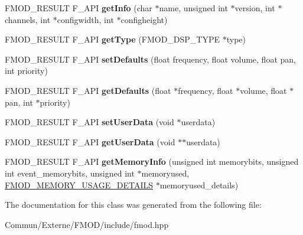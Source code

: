 \begin{DoxyCompactItemize}
\item 
F\+M\+O\+D\+\_\+\+R\+E\+S\+U\+LT F\+\_\+\+A\+PI {\bfseries get\+Info} (char $\ast$name, unsigned int $\ast$version, int $\ast$channels, int $\ast$configwidth, int $\ast$configheight)\hypertarget{class_f_m_o_d_1_1_d_s_p_a5bb61015d7b0e835437e46ea4eaf6442}{}\label{class_f_m_o_d_1_1_d_s_p_a5bb61015d7b0e835437e46ea4eaf6442}

\item 
F\+M\+O\+D\+\_\+\+R\+E\+S\+U\+LT F\+\_\+\+A\+PI {\bfseries get\+Type} (F\+M\+O\+D\+\_\+\+D\+S\+P\+\_\+\+T\+Y\+PE $\ast$type)\hypertarget{class_f_m_o_d_1_1_d_s_p_a7241c2669554667f90d4f2a576f64c4a}{}\label{class_f_m_o_d_1_1_d_s_p_a7241c2669554667f90d4f2a576f64c4a}

\item 
F\+M\+O\+D\+\_\+\+R\+E\+S\+U\+LT F\+\_\+\+A\+PI {\bfseries set\+Defaults} (float frequency, float volume, float pan, int priority)\hypertarget{class_f_m_o_d_1_1_d_s_p_a97919dbf4f783369b75f1bc43527489d}{}\label{class_f_m_o_d_1_1_d_s_p_a97919dbf4f783369b75f1bc43527489d}

\item 
F\+M\+O\+D\+\_\+\+R\+E\+S\+U\+LT F\+\_\+\+A\+PI {\bfseries get\+Defaults} (float $\ast$frequency, float $\ast$volume, float $\ast$pan, int $\ast$priority)\hypertarget{class_f_m_o_d_1_1_d_s_p_a80aa58e2f153dd3ad5fb6bf9305fc00e}{}\label{class_f_m_o_d_1_1_d_s_p_a80aa58e2f153dd3ad5fb6bf9305fc00e}

\item 
F\+M\+O\+D\+\_\+\+R\+E\+S\+U\+LT F\+\_\+\+A\+PI {\bfseries set\+User\+Data} (void $\ast$userdata)\hypertarget{class_f_m_o_d_1_1_d_s_p_a5aacd4725dbe50b725146bd6c412b0f4}{}\label{class_f_m_o_d_1_1_d_s_p_a5aacd4725dbe50b725146bd6c412b0f4}

\item 
F\+M\+O\+D\+\_\+\+R\+E\+S\+U\+LT F\+\_\+\+A\+PI {\bfseries get\+User\+Data} (void $\ast$$\ast$userdata)\hypertarget{class_f_m_o_d_1_1_d_s_p_a1b9014166d1ad45923da3227d8db3439}{}\label{class_f_m_o_d_1_1_d_s_p_a1b9014166d1ad45923da3227d8db3439}

\item 
F\+M\+O\+D\+\_\+\+R\+E\+S\+U\+LT F\+\_\+\+A\+PI {\bfseries get\+Memory\+Info} (unsigned int memorybits, unsigned int event\+\_\+memorybits, unsigned int $\ast$memoryused, \hyperlink{struct_f_m_o_d___m_e_m_o_r_y___u_s_a_g_e___d_e_t_a_i_l_s}{F\+M\+O\+D\+\_\+\+M\+E\+M\+O\+R\+Y\+\_\+\+U\+S\+A\+G\+E\+\_\+\+D\+E\+T\+A\+I\+LS} $\ast$memoryused\+\_\+details)\hypertarget{class_f_m_o_d_1_1_d_s_p_acac5f7f04e8e67719a712f848793e8f8}{}\label{class_f_m_o_d_1_1_d_s_p_acac5f7f04e8e67719a712f848793e8f8}

\end{DoxyCompactItemize}


The documentation for this class was generated from the following file\+:\begin{DoxyCompactItemize}
\item 
Commun/\+Externe/\+F\+M\+O\+D/include/fmod.\+hpp\end{DoxyCompactItemize}
